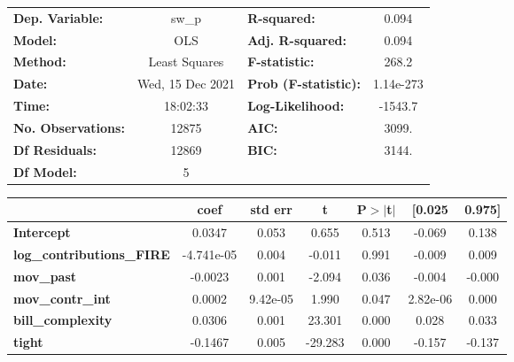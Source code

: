 \begin{center}
\begin{tabular}{lclc}
\toprule
\textbf{Dep. Variable:}           &      sw\_p       & \textbf{  R-squared:         } &     0.094   \\
\textbf{Model:}                   &       OLS        & \textbf{  Adj. R-squared:    } &     0.094   \\
\textbf{Method:}                  &  Least Squares   & \textbf{  F-statistic:       } &     268.2   \\
\textbf{Date:}                    & Wed, 15 Dec 2021 & \textbf{  Prob (F-statistic):} & 1.14e-273   \\
\textbf{Time:}                    &     18:02:33     & \textbf{  Log-Likelihood:    } &   -1543.7   \\
\textbf{No. Observations:}        &       12875      & \textbf{  AIC:               } &     3099.   \\
\textbf{Df Residuals:}            &       12869      & \textbf{  BIC:               } &     3144.   \\
\textbf{Df Model:}                &           5      & \textbf{                     } &             \\
\bottomrule
\end{tabular}
\begin{tabular}{lcccccc}
                                  & \textbf{coef} & \textbf{std err} & \textbf{t} & \textbf{P$> |$t$|$} & \textbf{[0.025} & \textbf{0.975]}  \\
\midrule
\textbf{Intercept}                &       0.0347  &        0.053     &     0.655  &         0.513        &       -0.069    &        0.138     \\
\textbf{log\_contributions\_FIRE} &   -4.741e-05  &        0.004     &    -0.011  &         0.991        &       -0.009    &        0.009     \\
\textbf{mov\_past}                &      -0.0023  &        0.001     &    -2.094  &         0.036        &       -0.004    &       -0.000     \\
\textbf{mov\_contr\_int}          &       0.0002  &     9.42e-05     &     1.990  &         0.047        &     2.82e-06    &        0.000     \\
\textbf{bill\_complexity}         &       0.0306  &        0.001     &    23.301  &         0.000        &        0.028    &        0.033     \\
\textbf{tight}                    &      -0.1467  &        0.005     &   -29.283  &         0.000        &       -0.157    &       -0.137     \\

\end{tabular}
\end{center}
